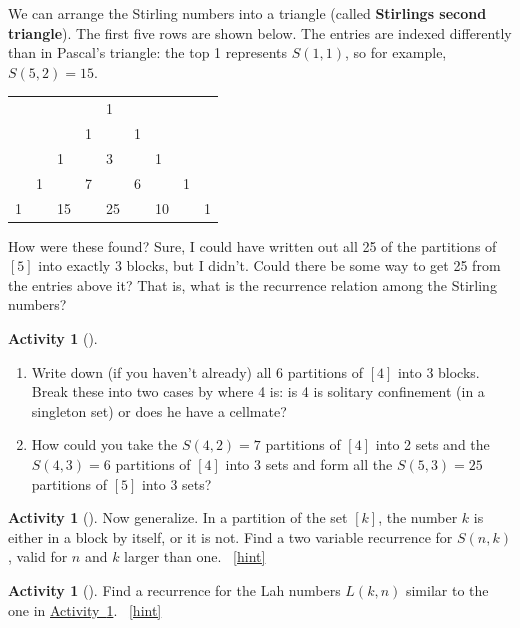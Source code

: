 \documentclass[10pt,]{book}
\newcommand{\terminology}[1]{\textbf{#1}}
\theoremstyle{plain}
\theoremstyle{definition}
\theoremstyle{definition}
\theoremstyle{definition}
\newtheorem{activity}[project]{Activity}
\numberwithin{equation}{chapter}
\begin{document}
\hypertarget{p-1087}{}%
We can arrange the Stirling numbers into a triangle (called \terminology{Stirlings second triangle}).  The first five rows are shown below.  The entries are indexed differently than in Pascal's triangle: the top 1 represents \(S(1,1)\), so for example, \(S(5,2) = 15\).%
\begin{sidebyside}{1}{0.25}{0.25}{0}
\begin{sbspanel}{0.5}
{\centering%
\begin{tabular}{lllllllll}
&&&&1&&&&\tabularnewline[0pt]
&&&1&&1&&&\tabularnewline[0pt]
&&1&&3&&1&&\tabularnewline[0pt]
&1&&7&&6&&1&\tabularnewline[0pt]
1&&15&&25&&10&&1
\end{tabular}
\par}
\end{sbspanel}
\end{sidebyside}
\par
\hypertarget{p-1088}{}%
How were these found?  Sure, I could have written out all 25 of the partitions of \([5]\) into exactly \(3\) blocks, but I didn't.  Could there be some way to get 25 from the entries above it?  That is, what is the recurrence relation among the Stirling numbers?%
\begin{activity}[]\label{activity-192}
\leavevmode%
\begin{enumerate}[font=\bfseries,label=(\alph*),ref=\alph*]
\item\label{task-213} \hypertarget{p-1089}{}%
Write down (if you haven't already) all 6 partitions of \([4]\) into \(3\) blocks.  Break these into two cases by where 4 is: is 4 is solitary confinement (in a singleton set) or does he have a cellmate?%
\item\label{task-214} \hypertarget{p-1090}{}%
How could you take the \(S(4,2) = 7\) partitions of \([4]\) into 2 sets and the \(S(4,3) = 6\) partitions of \([4]\) into 3 sets and form all the \(S(5,3) = 25\) partitions of \([5]\) into \(3\) sets?%
\end{enumerate}
\end{activity}
\begin{activity}[]\label{secondstirlingrecurrence}
\hypertarget{p-1091}{}%
Now generalize.  In a partition of the set \([k]\), the number \(k\) is either in a block by itself, or it is not.  Find a two variable recurrence for \(S(n,k)\), valid for \(n\) and \(k\) larger than one.%
~\hfill{\tiny\hyperlink{a-200}{[hint]}\hypertarget{q-200}{}}\end{activity}
\begin{activity}[]\label{activity-194}
\hypertarget{p-1094}{}%
Find a recurrence for the Lah numbers \(L(k,n)\) similar to the one in \hyperref[secondstirlingrecurrence]{Activity~\ref{secondstirlingrecurrence}}.%
~\hfill{\tiny\hyperlink{a-201}{[hint]}\hypertarget{q-201}{}}\end{activity}
\end{document}
